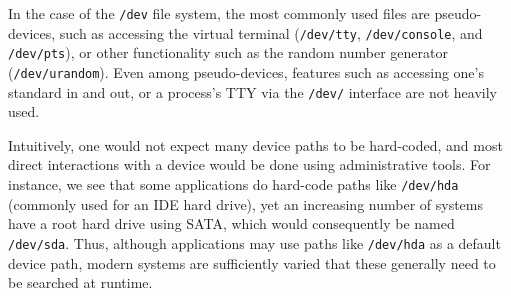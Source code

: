 





In the case of the {\tt /dev} file system, the most commonly used files are pseudo-devices, such as accessing
the virtual terminal ({\tt /dev/tty}, {\tt /dev/console}, and {\tt /dev/pts}), or other functionality 
such as the random number generator ({\tt /dev/urandom}).
Even among pseudo-devices, features such as accessing one's standard in and out, or a process's TTY
via the {\tt /dev/} interface are not heavily used.

Intuitively, one would not expect many device paths to be hard-coded, and most direct interactions 
with a device would be done using administrative tools.
For instance, we see that some applications do hard-code paths like {\tt /dev/hda} (commonly used for an IDE hard drive),
yet an increasing number of systems have a root hard drive using SATA, which would consequently be named {\tt /dev/sda}.
Thus, although applications may use paths like {\tt /dev/hda} as a default device path, modern systems are sufficiently varied
that these generally need to be searched at runtime.

